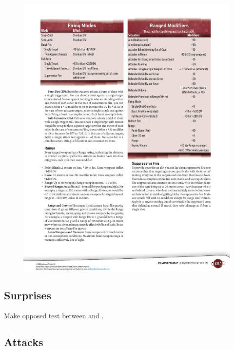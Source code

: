 \begin{figure}[htbp!]%
   \centering
   \includegraphics[scale=0.95]{gfx/combat-ranged-modifiers}%
\end{figure}%


\subsection*{Surprises}

\begin{itemize}
    \itembox Make opposed test between  and .
\end{itemize}


\subsection*{Attacks}


